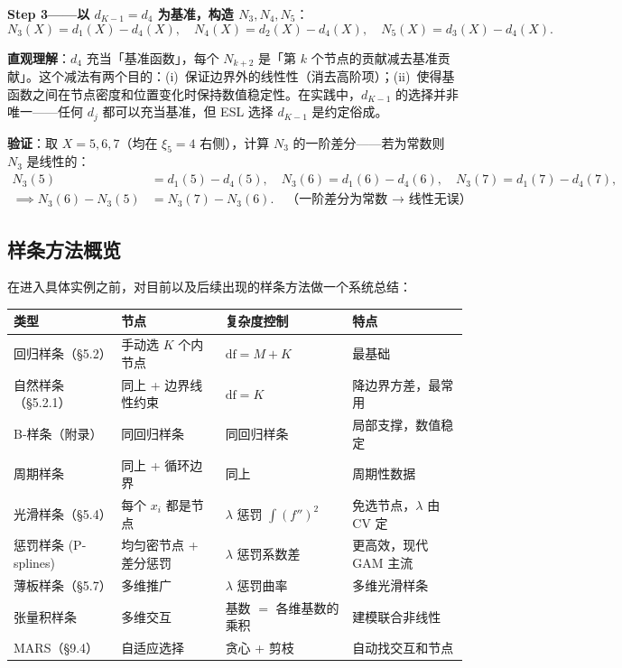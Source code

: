 \textbf{Step 3——以 $d_{K-1}=d_4$ 为基准，构造 $N_3,N_4,N_5$}：
\[
N_3(X) = d_1(X) - d_4(X),\quad
N_4(X) = d_2(X) - d_4(X),\quad
N_5(X) = d_3(X) - d_4(X).
\]

\textbf{直观理解}：$d_4$ 充当「基准函数」，每个 $N_{k+2}$ 是「第 $k$ 个节点的贡献减去基准贡献」。这个减法有两个目的：(i) 保证边界外的线性性（消去高阶项）；(ii) 使得基函数之间在节点密度和位置变化时保持数值稳定性。在实践中，$d_{K-1}$ 的选择并非唯一——任何 $d_j$ 都可以充当基准，但 ESL 选择 $d_{K-1}$ 是约定俗成。

\textbf{验证}：取 $X=5,6,7$（均在 $\xi_5=4$ 右侧），计算 $N_3$ 的一阶差分——若为常数则 $N_3$ 是线性的：
\begin{align*}
N_3(5) &= d_1(5) - d_4(5),\quad
N_3(6) = d_1(6) - d_4(6),\quad
N_3(7) = d_1(7) - d_4(7),\\
\implies N_3(6)-N_3(5) &= N_3(7)-N_3(6).\quad\text{（一阶差分为常数 → 线性无误）}
\end{align*}

\subsection{样条方法概览}

在进入具体实例之前，对目前以及后续出现的样条方法做一个系统总结：

\begin{center}
\small
\begin{tabular}{llll}
\toprule
类型 & 节点 & 复杂度控制 & 特点 \\
\midrule
回归样条（§5.2） & 手动选 $K$ 个内节点 & $\mathrm{df}=M+K$ & 最基础 \\
自然样条（§5.2.1） & 同上 + 边界线性约束 & $\mathrm{df}=K$ & 降边界方差，最常用 \\
B-样条（附录） & 同回归样条 & 同回归样条 & 局部支撑，数值稳定 \\
周期样条 & 同上 + 循环边界 & 同上 & 周期性数据 \\
光滑样条（§5.4） & 每个 $x_i$ 都是节点 & $\lambda$ 惩罚 $\int(f'')^2$ & 免选节点，$\lambda$ 由 CV 定 \\
惩罚样条 (P-splines) & 均匀密节点 + 差分惩罚 & $\lambda$ 惩罚系数差 & 更高效，现代 GAM 主流 \\
薄板样条（§5.7） & 多维推广 & $\lambda$ 惩罚曲率 & 多维光滑样条 \\
张量积样条 & 多维交互 & 基数 $=$ 各维基数的乘积 & 建模联合非线性 \\
MARS（§9.4） & 自适应选择 & 贪心 + 剪枝 & 自动找交互和节点 \\
\bottomrule
\end{tabular}
\end{center}

